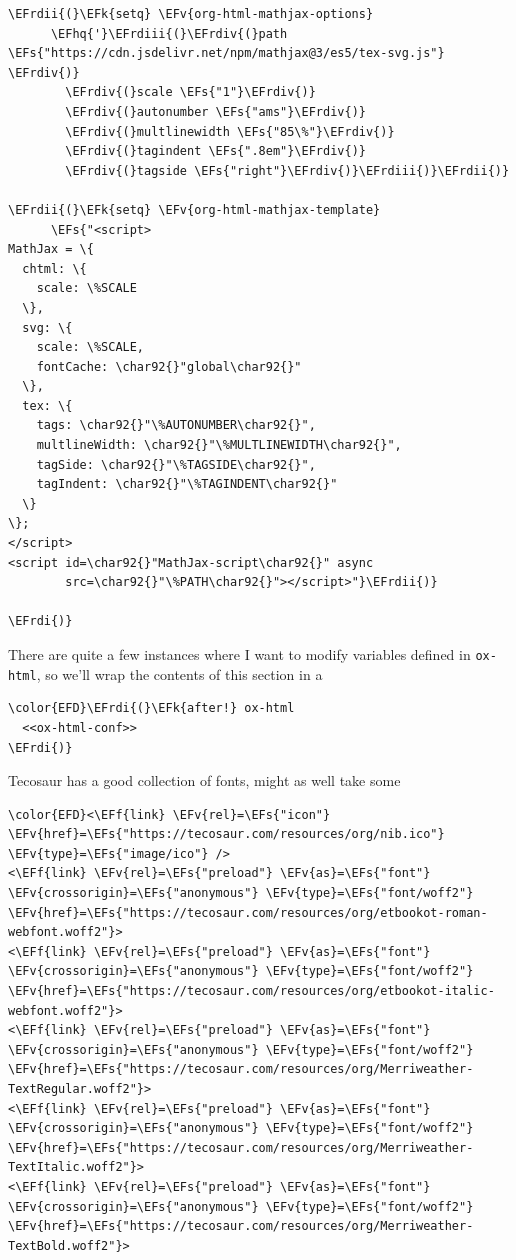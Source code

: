 \documentclass{scrartcl}
\newcommand{\EFk}[1]{\textcolor{EFk}{#1}} %
\newcommand{\EFs}[1]{\textcolor{EFs}{#1}} %
\newcommand{\EFv}[1]{\textcolor{EFv}{#1}} %
\newcommand{\EFf}[1]{\textcolor{EFf}{#1}} %
\newcommand{\EFhq}[1]{#1} %
\newcommand{\EFrdi}[1]{#1} %
\newcommand{\EFrdii}[1]{#1} %
\newcommand{\EFrdiii}[1]{#1} %
\newcommand{\EFrdiv}[1]{#1} %
\begin{document}
\begin{Code}
\begin{Verbatim}[]
                \EFrdii{(}\EFk{setq} \EFv{org-html-mathjax-options}
      \EFhq{'}\EFrdiii{(}\EFrdiv{(}path \EFs{"https://cdn.jsdelivr.net/npm/mathjax@3/es5/tex-svg.js"} \EFrdiv{)}
        \EFrdiv{(}scale \EFs{"1"}\EFrdiv{)}
        \EFrdiv{(}autonumber \EFs{"ams"}\EFrdiv{)}
        \EFrdiv{(}multlinewidth \EFs{"85\%"}\EFrdiv{)}
        \EFrdiv{(}tagindent \EFs{".8em"}\EFrdiv{)}
        \EFrdiv{(}tagside \EFs{"right"}\EFrdiv{)}\EFrdiii{)}\EFrdii{)}

\EFrdii{(}\EFk{setq} \EFv{org-html-mathjax-template}
      \EFs{"<script>
MathJax = \{
  chtml: \{
    scale: \%SCALE
  \},
  svg: \{
    scale: \%SCALE,
    fontCache: \char92{}"global\char92{}"
  \},
  tex: \{
    tags: \char92{}"\%AUTONUMBER\char92{}",
    multlineWidth: \char92{}"\%MULTLINEWIDTH\char92{}",
    tagSide: \char92{}"\%TAGSIDE\char92{}",
    tagIndent: \char92{}"\%TAGINDENT\char92{}"
  \}
\};
</script>
<script id=\char92{}"MathJax-script\char92{}" async
        src=\char92{}"\%PATH\char92{}"></script>"}\EFrdii{)}

\EFrdi{)}
\end{Verbatim}
\end{Code}

There are quite a few instances where I want to modify variables defined in
\texttt{ox-html}, so we'll wrap the contents of this section in a
\begin{Code}
\begin{Verbatim}[]
\color{EFD}\EFrdi{(}\EFk{after!} ox-html
  <<ox-html-conf>>
\EFrdi{)}
\end{Verbatim}
\end{Code}

Tecosaur has a good collection of fonts, might as well take some
\begin{Code}
\begin{Verbatim}[]
\color{EFD}<\EFf{link} \EFv{rel}=\EFs{"icon"} \EFv{href}=\EFs{"https://tecosaur.com/resources/org/nib.ico"} \EFv{type}=\EFs{"image/ico"} />
<\EFf{link} \EFv{rel}=\EFs{"preload"} \EFv{as}=\EFs{"font"} \EFv{crossorigin}=\EFs{"anonymous"} \EFv{type}=\EFs{"font/woff2"} \EFv{href}=\EFs{"https://tecosaur.com/resources/org/etbookot-roman-webfont.woff2"}>
<\EFf{link} \EFv{rel}=\EFs{"preload"} \EFv{as}=\EFs{"font"} \EFv{crossorigin}=\EFs{"anonymous"} \EFv{type}=\EFs{"font/woff2"} \EFv{href}=\EFs{"https://tecosaur.com/resources/org/etbookot-italic-webfont.woff2"}>
<\EFf{link} \EFv{rel}=\EFs{"preload"} \EFv{as}=\EFs{"font"} \EFv{crossorigin}=\EFs{"anonymous"} \EFv{type}=\EFs{"font/woff2"} \EFv{href}=\EFs{"https://tecosaur.com/resources/org/Merriweather-TextRegular.woff2"}>
<\EFf{link} \EFv{rel}=\EFs{"preload"} \EFv{as}=\EFs{"font"} \EFv{crossorigin}=\EFs{"anonymous"} \EFv{type}=\EFs{"font/woff2"} \EFv{href}=\EFs{"https://tecosaur.com/resources/org/Merriweather-TextItalic.woff2"}>
<\EFf{link} \EFv{rel}=\EFs{"preload"} \EFv{as}=\EFs{"font"} \EFv{crossorigin}=\EFs{"anonymous"} \EFv{type}=\EFs{"font/woff2"} \EFv{href}=\EFs{"https://tecosaur.com/resources/org/Merriweather-TextBold.woff2"}>
\end{Verbatim}
\end{Code}
\end{document}
